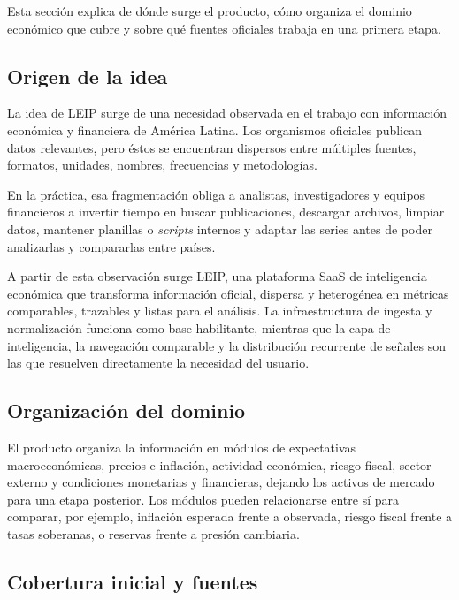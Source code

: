 \documentclass[11pt,a4paper]{article}
\newcommand{\proyectoNombre}{LEIP}
\begin{document}
Esta secci\'on explica de d\'onde surge el producto, c\'omo organiza el dominio
econ\'omico que cubre y sobre qu\'e fuentes oficiales trabaja en una primera
etapa.

\subsection{Origen de la idea}

La idea de \proyectoNombre{} surge de una necesidad observada en el trabajo con
informaci\'on econ\'omica y financiera de Am\'erica Latina. Los organismos
oficiales publican datos relevantes, pero \'estos se encuentran dispersos entre
m\'ultiples fuentes, formatos, unidades, nombres, frecuencias y metodolog\'ias.

En la pr\'actica, esa fragmentaci\'on obliga a analistas, investigadores y
equipos financieros a invertir tiempo en buscar publicaciones, descargar
archivos, limpiar datos, mantener planillas o \emph{scripts} internos y adaptar
las series antes de poder analizarlas y compararlas entre pa\'ises.

A partir de esta observaci\'on surge \proyectoNombre{}, una plataforma SaaS de
inteligencia econ\'omica que transforma informaci\'on oficial, dispersa y
heterog\'enea en m\'etricas comparables, trazables y listas para el an\'alisis.
La infraestructura de ingesta y normalizaci\'on funciona como base habilitante,
mientras que la capa de inteligencia, la navegaci\'on comparable y la
distribuci\'on recurrente de se\~nales son las que resuelven directamente la
necesidad del usuario.

\subsection{Organizaci\'on del dominio}

El producto organiza la informaci\'on en m\'odulos de expectativas
macroecon\'omicas, precios e inflaci\'on, actividad econ\'omica, riesgo fiscal,
sector externo y condiciones monetarias y financieras, dejando los activos de
mercado para una etapa posterior. Los m\'odulos pueden relacionarse entre s\'i
para comparar, por ejemplo, inflaci\'on esperada frente a observada, riesgo
fiscal frente a tasas soberanas, o reservas frente a presi\'on cambiaria.

\subsection{Cobertura inicial y fuentes}
\end{document}
